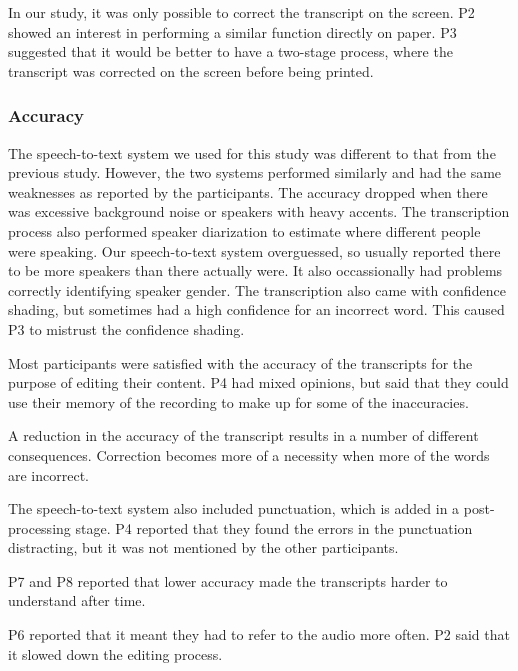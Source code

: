 
In our study, it was only possible to correct the transcript on the screen. P2 showed an interest in performing a
similar function directly on paper. P3 suggested that it would be better to have a two-stage process, where the
transcript was corrected on the screen before being printed.

\subsubsection{Accuracy}


The speech-to-text system we used for this study was different to that from the previous study. However, the two
systems performed similarly and had the same weaknesses as reported by the participants. The accuracy dropped when
there was excessive background noise or speakers with heavy accents. The transcription process also performed speaker
diarization to estimate where different people were speaking. Our speech-to-text system overguessed, so usually
reported there to be more speakers than there actually were. It also occassionally had problems correctly identifying
speaker gender. The transcription also came with confidence shading, but sometimes had a high confidence for an
incorrect word. This caused P3 to mistrust the confidence shading.


Most participants were satisfied with the accuracy of the transcripts for the purpose of editing their content. P4 had
mixed opinions, but said that they could use their memory of the recording to make up for some of the inaccuracies.

A reduction in the accuracy of the transcript results in a number of different consequences. Correction becomes more of
a necessity when more of the words are incorrect.


The speech-to-text system also included punctuation, which is added in a post-processing stage. P4 reported that they
found the errors in the punctuation distracting, but it was not mentioned by the other participants.


P7 and P8 reported that lower accuracy made the transcripts harder to understand after time.

P6 reported that it meant they had to refer to the audio more often. P2 said that it slowed down the editing process.

